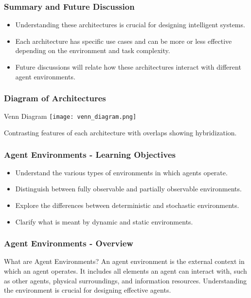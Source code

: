 \documentclass[aspectratio=169]{beamer}
\begin{document}
\begin{frame}[fragile]
  \frametitle{Summary and Future Discussion}
  \begin{itemize}
    \item Understanding these architectures is crucial for designing intelligent systems.
    \item Each architecture has specific use cases and can be more or less effective depending on the environment and task complexity.
    \item Future discussions will relate how these architectures interact with different agent environments.
  \end{itemize}
\end{frame}

\begin{frame}[fragile]
  \frametitle{Diagram of Architectures}
  \begin{block}{Venn Diagram}
    \texttt{[image: venn\_diagram.png]} %
    \caption{Contrasting features of each architecture with overlaps showing hybridization.}
  \end{block}
\end{frame}

\begin{frame}[fragile]
    \frametitle{Agent Environments - Learning Objectives}
    \begin{itemize}
        \item Understand the various types of environments in which agents operate.
        \item Distinguish between fully observable and partially observable environments.
        \item Explore the differences between deterministic and stochastic environments.
        \item Clarify what is meant by dynamic and static environments.
    \end{itemize}
\end{frame}

\begin{frame}[fragile]
    \frametitle{Agent Environments - Overview}
    \begin{block}{What are Agent Environments?}
        An agent environment is the external context in which an agent operates. It includes all elements an agent can interact with, such as other agents, physical surroundings, and information resources. 
        Understanding the environment is crucial for designing effective agents.
    \end{block}
\end{frame}
\end{document}
